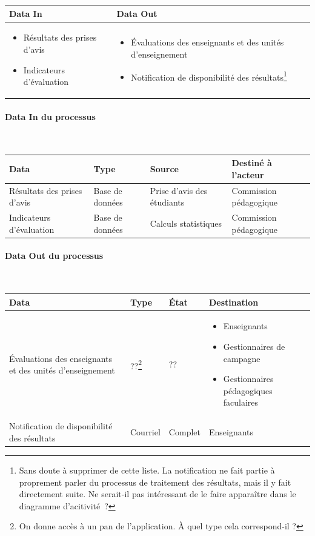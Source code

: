 \documentclass[a4paper,11pt]{report}
\begin{document}
\begin{tabularx}{\linewidth}{|X|X|} \hline
Data In & Data Out \\ \hline
\begin{itemize}
	\item Résultats des prises d'avis
	\item Indicateurs d'évaluation\newline{}
\end{itemize}
 & 
\begin{itemize}
	\item Évaluations des enseignants et des unités d'enseignement
	\item Notification de disponibilité des résultats\footnote{Sans doute à supprimer de cette liste. La notification ne fait partie à proprement parler du processus de traitement des résultats, mais il y fait directement suite. Ne serait-il pas intéressant de le faire apparaître dans le diagramme d'acitivité~?}\newline{}
\end{itemize}
\\ \hline
\end{tabularx}

\paragraph{Data In du processus}~\newline{}

\begin{tabularx}{\linewidth}{|X|X|X|X|} \hline
Data & Type & Source & Destiné à l'acteur \\ \hline
Résultats des prises d'avis & Base de données & Prise d'avis des étudiants & Commission pédagogique \\
Indicateurs d'évaluation & Base de données & Calculs statistiques & Commission pédagogique \\ \hline
\end{tabularx}

\paragraph{Data Out du processus}~\newline{}

\begin{tabularx}{\linewidth}{|X|X|X|X|} \hline
Data & Type & État & Destination \\ \hline
Évaluations des enseignants et des unités d'enseignement & ??\footnote{On donne accès à un pan de l'application. À quel type cela correspond-il ?} & ?? & 
\begin{itemize}
	\item Enseignants
	\item Gestionnaires de campagne
	\item Gestionnaires pédagogiques faculaires\newline{}
\end{itemize}
\\
Notification de disponibilité des résultats & Courriel & Complet & Enseignants \\ \hline
\end{tabularx}
\end{document}
